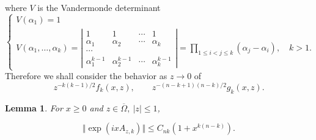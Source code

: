 \documentclass{surv-l}
\theoremstyle{plain}
\newtheorem{lemma}[theorem]{Lemma}
\theoremstyle{definition}
\numberwithin{equation}{chapter}
\begin{document}
where $V$ is the Vandermonde determinant
\begin{equation}\label{eq6.2}
\left\{\begin{array}{ll}
V(\alpha_{1})=1 & \\
V(\alpha_{1},\ldots,\alpha_{k})=\left|\begin{array}{cccc}
                                      1 & 1 & \cdots & 1 \\
                                      \alpha_{1} & \alpha_{2} & \cdots & \alpha_{k} \\
                                      \cdots &  &  &  \\
                                      {\alpha_{1}^{k-1}} & {\alpha_{2}^{k-1}} & \cdots & {\alpha_{k}^{k-1}}
                                    \end{array}\right|
=\prod_{1\leq i<j\leq k}(\alpha_{j}-\alpha_{i}),\quad k>1.
\end{array}\right.
\end{equation}
Therefore we shall consider the behavior as $z\rightarrow 0$ of
\begin{equation}\label{eq6.3}
z^{-k(k-1)/2}f_{k}(x, z),\qquad z^{-(n-k+1)(n-k)/2}g_{k}(x, z).
\end{equation}
\setcounter{theorem}{3}
\begin{lemma}\label{chap01:lem6.4}
For $x\geq 0$ and $z\in\overline{\Omega},\ |z|\leq 1$,
\end{lemma}
\setcounter{equation}{4}
\begin{equation}\label{eq6.5}
\Vert\exp(ixA_{z,k})\Vert\leq C_{nk}(1+x^{k(n-k)}).
\end{equation}
\end{document}
